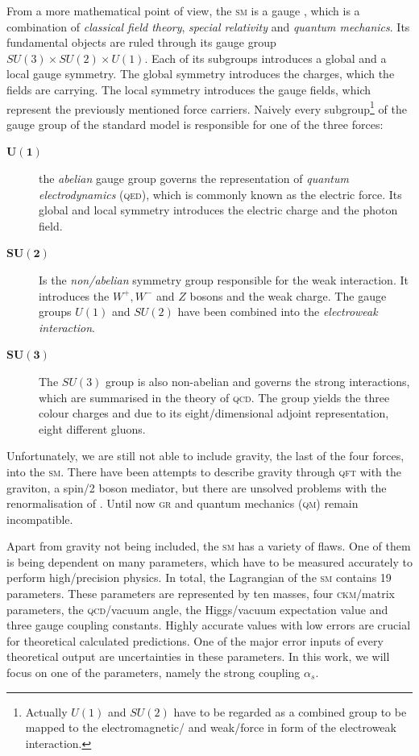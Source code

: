 \documentclass[../../index.tex]{subfiles}
\begin{document}
From a more mathematical point of view, the \textsc{sm} is a gauge
, which is a combination of \textit{classical
  field theory}, \textit{special relativity} and \textit{quantum mechanics}. Its
fundamental objects are ruled through its gauge group \(SU(3)\times SU(2)\times
U(1)\). Each of its subgroups introduces a global and a local gauge symmetry.
The global symmetry introduces the charges, which the fields are carrying. The
local symmetry introduces the gauge fields, which represent the previously
mentioned force carriers. Naively every subgroup\footnote{Actually \(U(1)\) and
  \(SU(2)\) have to be regarded as a combined group to be mapped to the
  electromagnetic\-/ and weak\-/force in form of the electroweak interaction.}
of the gauge group of the standard model is responsible for one of the three
forces:
\begin{description}
\item[\(\bm{U(1)}\)] the \textit{abelian} gauge group governs the representation
  of \textit{quantum electrodynamics} (\textsc{qed}), which is commonly known as
  the electric force. Its global and local symmetry introduces the electric
  charge and the photon field.
\item[\(\bm{SU(2)}\)] Is the \textit{non\-/abelian} symmetry group responsible
  for the weak interaction. It introduces the \(W^+,W^-\) and \(Z\) bosons and
  the weak charge. The gauge groups \(U(1)\) and \(SU(2)\) have been combined
  into the \textit{electroweak interaction}.
\item[\(\bm{SU(3)}\)] The \(SU(3)\) group is also non-abelian and governs the
  strong interactions, which are summarised in the theory of \textsc{qcd}. The
  group yields the three colour charges and due to its eight\-/dimensional
  adjoint representation, eight different gluons.
\end{description}
Unfortunately, we are still not able to include gravity, the last of the four
forces, into the \textsc{sm}. There have been attempts to describe gravity
through \textsc{qft} with the graviton, a spin\-/2 boson mediator, but there are
unsolved problems with the renormalisation of .
Until now \textsc{gr} and quantum mechanics (\textsc{qm}) remain incompatible.

Apart from gravity not being included, the \textsc{sm} has a variety of flaws.
One of them is being dependent on many parameters, which have to be measured
accurately to perform high\-/precision physics. In total, the Lagrangian of the
\textsc{sm} contains 19 parameters. These parameters are represented by ten
masses, four \textsc{ckm}\-/matrix parameters, the \textsc{qcd}\-/vacuum angle,
the Higgs\-/vacuum expectation value and three gauge coupling constants. Highly
accurate values with low errors are crucial for theoretical calculated
predictions. One of the major error inputs of every theoretical output are
uncertainties in these parameters. In this work, we will focus on one of the
parameters, namely the strong coupling \(\alpha_s\).
\end{document}
